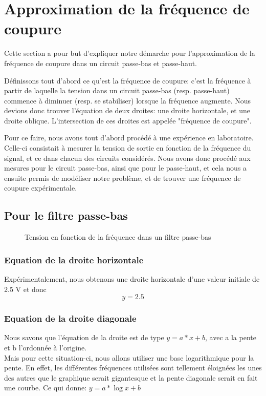 \documentclass{article}
\begin{document}
 
\section{Approximation de la fréquence de coupure}

Cette section a pour but d'expliquer notre démarche pour l'approximation de la fréquence de coupure dans un circuit passe-bas et passe-haut. 

Définissons tout d'abord ce qu'est la fréquence de coupure: c'est la fréquence à partir de laquelle la tension dans un circuit passe-bas (resp. passe-haut) commence à diminuer (resp. se stabiliser) lorsque la fréquence augmente.
Nous devions donc trouver l'équation de deux droites: une droite horizontale, et une droite oblique. L'intersection de ces droites est appelée "fréquence de coupure".

Pour ce faire, nous avons tout d'abord procédé à une expérience en laboratoire. 
Celle-ci consistait à mesurer la tension de sortie en fonction de la fréquence du signal, et ce dans chacun des circuits considérés. 
Nous avons donc procédé aux mesures pour le circuit passe-bas, ainsi que pour le passe-haut, et cela nous a ensuite permis de modéliser notre problème, et de trouver une fréquence de coupure expérimentale.


\subsection{Pour le filtre passe-bas}


\begin{figure}[h]
   \centering
   
   \caption{\label{premierebissectrice}Tension en fonction de la fréquence dans un filtre passe-bas}
\end{figure}




\subsubsection{Equation de la droite horizontale} %
Expérimentalement, nous obtenons une droite horizontale d'une valeur initiale de 2.5 V et donc \[y=2.5\]

\subsubsection{Equation de la droite diagonale}

Nous savons que l'équation de la droite est de type $y=a*x+b$, avec a la pente et b l'ordonnée à l'origine.
\\
Mais pour cette situation-ci, nous allons utiliser une base logarithmique pour la pente.  En effet, les différentes fréquences utilisées sont tellement éloignées les unes des autres que le graphique serait gigantesque et la pente diagonale serait en fait une courbe.  Ce qui donne: $y=a*\log{x}+b$
\end{document}
